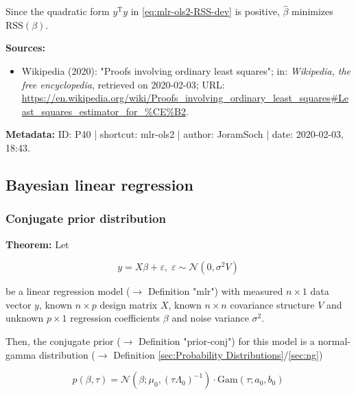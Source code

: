 \documentclass[a4paper,12pt]{book}
\begin{document}
Since the quadratic form $y^\mathrm{T} y$ in \eqref{eq:mlr-ols2-RSS-dev} is positive, $\hat{\beta}$ minimizes $\mathrm{RSS}(\beta)$.

\vspace{1em}
\textbf{Sources:}
\begin{itemize}
\item Wikipedia (2020): "Proofs involving ordinary least squares"; in: \textit{Wikipedia, the free encyclopedia}, retrieved on 2020-02-03; URL: \url{https://en.wikipedia.org/wiki/Proofs_involving_ordinary_least_squares#Least_squares_estimator_for_%CE%B2}.
\end{itemize}


\vspace{1em}
\textbf{Metadata:} ID: P40 | shortcut: mlr-ols2 | author: JoramSoch | date: 2020-02-03, 18:43.


\subsection{Bayesian linear regression}

\subsubsection[\textbf{Conjugate prior distribution}]{Conjugate prior distribution} \label{sec:blr-prior}

\vspace{1em}
\textbf{Theorem:} Let

\begin{equation} \label{eq:blr-prior-GLM}
y = X \beta + \varepsilon, \; \varepsilon \sim \mathcal{N}(0, \sigma^2 V)
\end{equation}

be a linear regression model ($\rightarrow$ Definition "mlr") with measured $n \times 1$ data vector $y$, known $n \times p$ design matrix $X$, known $n \times n$ covariance structure $V$ and unknown $p \times 1$ regression coefficients $\beta$ and noise variance $\sigma^2$.

Then, the conjugate prior ($\rightarrow$ Definition "prior-conj") for this model is a normal-gamma distribution ($\rightarrow$ Definition \ref{sec:Probability Distributions}/\ref{sec:ng})

\begin{equation} \label{eq:blr-prior-GLM-NG-prior}
p(\beta,\tau) = \mathcal{N}(\beta; \mu_0, (\tau \Lambda_0)^{-1}) \cdot \mathrm{Gam}(\tau; a_0, b_0)
\end{equation}
\end{document}
